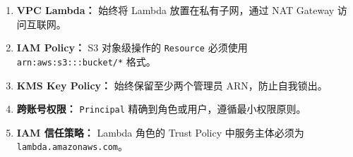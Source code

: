 \documentclass[12pt, a4paper]{article}
\begin{document}
\begin{enumerate}
    \item \textbf{VPC Lambda：} 始终将 Lambda 放置在私有子网，通过 NAT Gateway 访问互联网。
    \item \textbf{IAM Policy：} S3 对象级操作的 \texttt{Resource} 必须使用 \texttt{arn:aws:s3:::bucket/*} 格式。
    \item \textbf{KMS Key Policy：} 始终保留至少两个管理员 ARN，防止自我锁出。
    \item \textbf{跨账号权限：} \texttt{Principal} 精确到角色或用户，遵循最小权限原则。
    \item \textbf{IAM 信任策略：} Lambda 角色的 Trust Policy 中服务主体必须为 \texttt{lambda.amazonaws.com}。
\end{enumerate}
\end{document}

